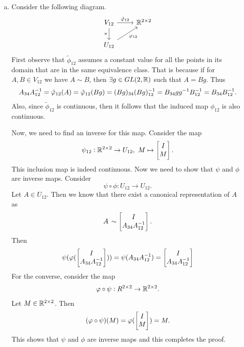 \begin{solution}
\begin{enumerate}[(a)]
		\item Consider the following diagram.
		\[\begin{tikzcd}
			{V_{12}} & {\R^{2\times 2}} \\
			{U_{12}}
			\arrow["{\tilde{\phi}_{12}}", from=1-1, to=1-2]
			\arrow["\pi"', from=1-1, to=2-1]
			\arrow["{\phi_{12}}"', from=2-1, to=1-2]
		\end{tikzcd}\]
		First observe that $ \tilde{\phi}_{12} $ assumes a constant value for all the points in its domain that are in the same equivalence class. That is because if for $ A,B \in V_{12} $ we have $ A\sim B $, then $ \exists g \in GL(2,\mathbb{R}) $ such that $ A = Bg $. Thus
		\[ A_{34}A^{-1}_{12} = \tilde{\varphi}_{12} (A) = \tilde{\varphi}_{12}(Bg) = (Bg)_{34}(Bg)^{-1}_{12} = B_{34}g g^{-1}B^{-1}_{12} = B_{34}B^{-1}_{12}. \]
		Also, since $ \tilde{\phi}_{12} $ is continuous, then it follows that the induced map $ \phi_{12} $ is also continuous.
		
		Now, we need to find an inverse for this map. Consider the map
		\[ \psi_{12} : \mathbb{R}^{2\times 2} \to U_{12}, \ M \mapsto \begin{bmatrix} I \\ M \end{bmatrix}. \]
		This inclusion map is indeed continuous. Now we need to show that $ \psi $ and $ \phi $ are inverse maps. Consider 
		\[ \psi\circ{\phi} : U_{12} \to U_{12}. \]
		Let $ A \in U_{12} $. Then we know that there exist a canonical representation of $ A $ as 
		\[ A \ \sim \vectt{I}{A_{34}\inv{A}_{12}}. \]
		Then 
		\[ \psi(\varphi( \begin{bmatrix} I \\ A_{34}A^{-1}_{12} \end{bmatrix})) = \psi(A_{34}A^{-1}_{12}) = \begin{bmatrix} I \\ A_{34}A^{-1}_{12} \end{bmatrix} \]
		For the converse, consider the map
		\[ \varphi\circ{\psi}: R^{2\times 2}\to \mathbb{R}^{2\times 2}. \]
		Let $ M \in \mathbb{R}^{2\times 2} $. Then 
		\[ (\varphi\circ{\psi})(M) = \varphi(\begin{bmatrix} I \\ M \end{bmatrix}) = M.  \]
		This shows that $ \psi $ and $ \phi $ are inverse maps and this completes the proof.
		
		
	\end{enumerate}
	
\end{solution}

\newpage
